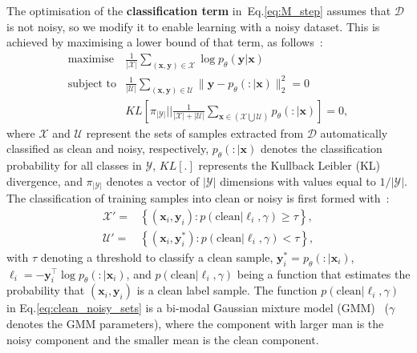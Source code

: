 \documentclass[review]{elsarticle}
\theoremstyle{plain}
\begin{document}
The optimisation of the \textbf{classification term} in~Eq.\ref{eq:M_step} assumes that $\mathcal{D}$ is not noisy, so we modify it to enable learning with a noisy dataset.  This is achieved by maximising a lower bound of that term, as follows~\citep{li2020dividemix}:
\begin{equation}
    \begin{split}
        \text{maximise} & \frac{1}{|\mathcal{X}|}\sum_{(\mathbf{x},\mathbf{y}) \in \mathcal{X}} \log p_{\theta}(\mathbf{y}|\mathbf{x}) \\
        \text{subject to} & \frac{1}{|\mathcal{U}|} \sum_{(\mathbf{x},\mathbf{y}) \in \mathcal{U}}\| \mathbf{y} - p_{\theta}(:|\mathbf{x}) \|_2^2 = 0 \\
        & KL \left [ \pi_{|\mathcal{Y}|} \Bigg | \Bigg | \frac{1}{|\mathcal{X}| + |\mathcal{U}|} \sum_{\mathbf{x} \in (\mathcal{X} \bigcup \mathcal{U})} p_{\theta}(:|\mathbf{x}) \right ]=0,
    \end{split}
    \label{eq:max_likelihood_optimisation}
\end{equation}
where $\mathcal{X}$ and $\mathcal{U}$ represent the
sets of samples extracted from $\mathcal{D}$ automatically classified as clean and noisy, respectively, $p_{\theta}(:|\mathbf{x})$ denotes the classification probability for all classes in $\mathcal{Y}$, $KL[.]$ represents the Kullback Leibler (KL) divergence, and $\pi_{|\mathcal{Y}|}$ denotes a vector of $|\mathcal{Y}|$ dimensions with values equal to $1/|\mathcal{Y}|$.  
The classification of training samples into clean or noisy is first formed with~\citep{arazo2019unsupervised, li2020dividemix,rog, jiang2020beyond}:
\begin{equation}
\begin{split}
    \mathcal{X}'  = & \left \{ (\mathbf{x}_i,\mathbf{y}_i) : p \left ( \text{clean} | \ell_i , \gamma \right ) \ge \tau \right \}, \\
    \mathcal{U}'  = & \left \{ (\mathbf{x}_i,\mathbf{y}_i^{*}) : 
p \left ( \text{clean} | \ell_i , \gamma \right ) < \tau \right \},
\end{split}
\label{eq:clean_noisy_sets}
\end{equation} 
with $\tau$ denoting a threshold to classify a clean sample, $\mathbf{y}_i^{*} = p_{\theta}(:|\mathbf{x}_i)$,
$\ell_i = -\mathbf{y}_i^{\top}\log p_{\theta}(:|\mathbf{x}_i)$, and $p \left ( \text{clean} | \ell_i , \gamma \right )$ being a function that estimates the probability that $(\mathbf{x}_i,\mathbf{y}_i)$ is a clean label sample.  The function $p \left ( \text{clean} | \ell_i , \gamma \right )$ in Eq.\ref{eq:clean_noisy_sets} is a bi-modal Gaussian mixture model (GMM)~\citep{li2020dividemix} ($\gamma$ denotes the GMM parameters), where the component with larger man is the noisy component and the smaller mean is the clean component.
\end{document}
